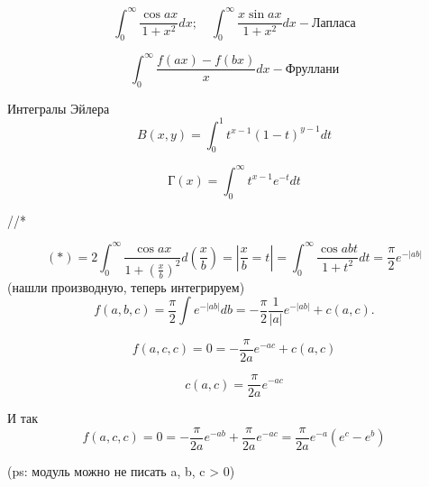 \documentclass[12pt]{report}
\begin{document}
	$$
	\int_{0}^{\infty}
	\frac{\cos ax}{1+x^2} dx; \quad
	\int_{0}^{\infty}
	\frac{x \sin ax}{1+x^2} dx
	- \textbf{Лапласа}
	$$
	
	$$
	\int_{0}^{\infty}
	\frac{f(ax) - f(bx)}{x} dx
	- \textbf{Фруллани}
	$$
	
	Интегралы Эйлера
	$$
	B(x, y) =
	\int_{0}^{1}
	t^{x-1} \left(1 - t\right)^{y-1} dt
	$$
	
	$$
	Г(x) = 
	\int_{0}^{\infty}
	t^{x-1} e^{-t} dt
	$$
	
	//*
	
	$$
	(*) = 
	2 
	\int_{0}^{\infty}
	\frac{\cos ax}{1 + \left(\frac{x}{b} \right)^{2}} d\left(\frac{x}{b} \right) = 
	\left| \frac{x}{b} = t \right| = 
	\int_{0}^{\infty}
	\frac{\cos abt}{1 + t^{2}} dt =
	\frac{\pi}{2} e^{- \left|ab\right|}
	$$
	(нашли производную, теперь интегрируем)
	$$
	f(a, b, c) = 
	\frac{\pi}{2}
	\int e^{- \left|ab\right|} db = 
	- \frac{\pi}{2}
	\frac{1}{\left|a\right|}
	e^{- \left|ab\right|} + 
	c(a, c).
	$$
	
	$$
	f(a, c, c) = 
	0 =
	-\frac{\pi}{2a}
	e^{-ac} + c(a, c)
	$$
	
	$$
	c(a, c) = \frac{\pi}{2a}e^{-ac}
	$$
	
	И так
	$$
	f(a, c, c) = 
	0 =
	-\frac{\pi}{2a}
	e^{-ab} +
	\frac{\pi}{2a}e^{-ac} =
	\frac{\pi}{2a}
	e^{-a}
	\left(e^{c} - e^{b}\right)
	$$
	
	(ps: модуль можно не писать a, b, c > 0)
	
\end{document}
